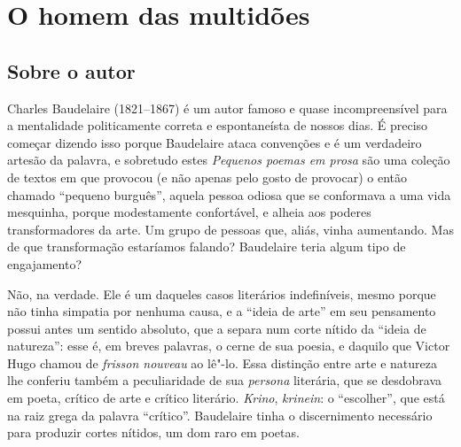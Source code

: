 \paginabranca
\chapter{O homem das multidões}



\section{Sobre o autor}

\noindent{}Charles Baudelaire (1821--1867) é um autor famoso e quase
incompreensível para a mentalidade politicamente correta e
espontaneísta de nossos dias. É preciso começar dizendo isso porque
Baudelaire ataca convenções e é um verdadeiro artesão da palavra, e
sobretudo estes \textit{Pequenos poemas em prosa} são uma coleção de
textos em que provocou (e não apenas pelo gosto de provocar) o então
chamado “pequeno burguês”, aquela pessoa odiosa que se conformava a uma
vida mesquinha, porque modestamente confortável, e alheia aos poderes
transformadores da arte. Um grupo de pessoas que, aliás, vinha
aumentando. Mas de que transformação estaríamos falando? Baudelaire
teria algum tipo de engajamento?

Não, na verdade. Ele é um daqueles casos literários indefiníveis, mesmo
porque não tinha simpatia por nenhuma causa, e a “ideia de arte”
em seu pensamento possui antes um sentido absoluto, que a separa num
corte nítido da “ideia de natureza”: esse é, em breves palavras,
o cerne de sua poesia, e daquilo que Victor Hugo chamou de \textit{frisson
nouveau} ao lê"-lo. Essa distinção entre arte e natureza lhe
conferiu também a peculiaridade de sua \textit{persona} literária, que
se desdobrava em poeta, crítico de arte e crítico literário. \textit{Krino},
\textit{krinein}: o “escolher”, que está na raiz grega da palavra
 “crítico”. Baudelaire tinha o discernimento necessário para
produzir cortes nítidos, um dom raro em poetas.

